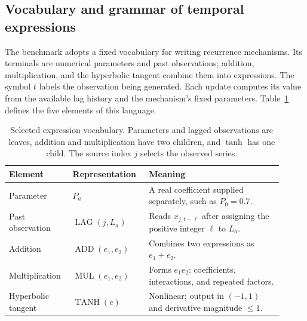 \subsection{Vocabulary and grammar of temporal expressions}
\label{sec:generator-vocabulary}

The benchmark adopts a fixed vocabulary for writing recurrence mechanisms.
Its terminals are numerical parameters and past observations; addition,
multiplication, and the hyperbolic tangent combine them into expressions.
The symbol $t$ labels the observation being generated. Each update computes
its value from the available lag history and the mechanism's fixed parameters.
Table~\ref{tab:generator-vocabulary} defines the five elements of this language.

\begin{table}[H]
\centering\small
\begin{tabular}{@{}
>{\raggedright\arraybackslash}p{0.20\linewidth}
>{\raggedright\arraybackslash}p{0.25\linewidth}
>{\raggedright\arraybackslash}p{0.46\linewidth}@{}}
\toprule
Element & Representation & Meaning \\
\midrule
Parameter & $P_a$ &
A real coefficient supplied separately, such as $P_0=0.7$. \\
Past observation & $\operatorname{LAG}(j,L_a)$ &
Reads $x_{j,t-\ell}$ after assigning the positive integer $\ell$ to $L_a$. \\
Addition & $\operatorname{ADD}(e_1,e_2)$ &
Combines two expressions as $e_1+e_2$. \\
Multiplication & $\operatorname{MUL}(e_1,e_2)$ &
Forms $e_1e_2$: coefficients, interactions, and repeated factors. \\
Hyperbolic tangent & $\operatorname{TANH}(e)$ &
Nonlinear; output in $(-1,1)$ and derivative magnitude $\leq1$. \\
\bottomrule
\end{tabular}
\caption{Selected expression vocabulary. Parameters and lagged observations
are leaves, addition and multiplication have two children, and $\tanh$ has
one child. The source index $j$ selects the observed series.}
\label{tab:generator-vocabulary}
\end{table}

